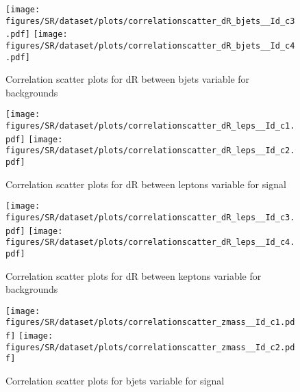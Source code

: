 \begin{figure}[!htb]%
\centering
\texttt{[image: figures/SR/dataset/plots/correlationscatter\_dR\_bjets\_\_Id\_c3.pdf]}
\texttt{[image: figures/SR/dataset/plots/correlationscatter\_dR\_bjets\_\_Id\_c4.pdf]}
\caption{ Correlation scatter plots for dR between bjets variable for backgrounds}%
\label{fig:correlations_SR_drbjets_BG}                                                       
\end{figure}




\begin{figure}[!htb]%
\centering
\texttt{[image: figures/SR/dataset/plots/correlationscatter\_dR\_leps\_\_Id\_c1.pdf]}
\texttt{[image: figures/SR/dataset/plots/correlationscatter\_dR\_leps\_\_Id\_c2.pdf]}
\caption{ Correlation scatter plots for dR between leptons variable for signal}%
\label{fig:correlations_SR_drleps_S}                                                       
\end{figure}



\begin{figure}[!htb]%
\centering
\texttt{[image: figures/SR/dataset/plots/correlationscatter\_dR\_leps\_\_Id\_c3.pdf]}
\texttt{[image: figures/SR/dataset/plots/correlationscatter\_dR\_leps\_\_Id\_c4.pdf]}
\caption{ Correlation scatter plots for dR between keptons variable for backgrounds}%
\label{fig:correlations_SR_drleps_BG}                                                       
\end{figure}



\begin{figure}[!htb]%
\centering
\texttt{[image: figures/SR/dataset/plots/correlationscatter\_zmass\_\_Id\_c1.pdf]}
\texttt{[image: figures/SR/dataset/plots/correlationscatter\_zmass\_\_Id\_c2.pdf]}
\caption{ Correlation scatter plots for \Zll bjets variable for signal}%
\label{fig:correlations_SR_zmass_S}                                                       
\end{figure}



